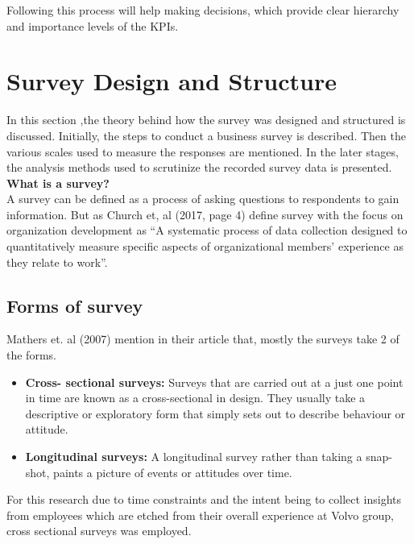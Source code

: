 Following this process will help making decisions, which provide clear hierarchy and importance levels of the KPIs.

\section{Survey Design and Structure}
In this section ,the theory behind how the survey was designed and structured is discussed. Initially, the steps to conduct a business survey is described. Then the various scales used to measure the responses are mentioned. In the later stages, the analysis methods used to scrutinize the recorded survey data is presented.\\

\textbf{What is a survey?}\\
A survey can be defined as a process of asking questions to respondents to gain information. But as Church et, al (2017, page 4) define survey with the focus on organization development as “A systematic process of data collection designed to quantitatively measure specific aspects of organizational members' experience as they relate to work”.\\

\subsection{Forms of survey}
Mathers et. al (2007) mention in their article that, mostly the surveys take 2 of the forms.\\

\begin{itemize}
    \item \textbf{Cross- sectional surveys:} Surveys that are carried out at a just one point in time are known as a cross-sectional in design. They usually take a descriptive or exploratory form that simply sets out to describe behaviour or attitude. \\


    \item \textbf{Longitudinal surveys:} A longitudinal survey rather than taking a snap-shot, paints a picture of events or attitudes over time.\\


\end{itemize}

For this research due to time constraints and the intent being to collect insights from employees which are etched from their overall experience at Volvo group, cross sectional surveys was employed.\\

